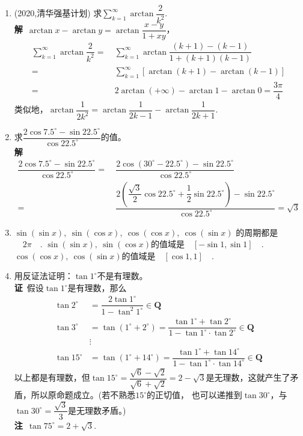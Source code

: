 \begin{enumerate}[label={【\textbf{例\thechapter.\arabic*}】},
 leftmargin=\inteval{\myenumleftmargin}pt,
 itemsep=\inteval{\myenumitempsep}pt,
 itemindent=\inteval{\myenumitemindent}pt]
\item (2020,清华强基计划) 求$ \sum\limits_{k=1}^{\infty}\arctan\dfrac{2}{k^2} $. 
\\ \textbf{解}\ $ \arctan x-\arctan y=\arctan\dfrac{x-y}{1+xy} $，
\begin{align*}
    \sum_{k=1}^{\infty}\arctan\dfrac{2}{k^2} 
    =&\ \sum_{k=1}^{\infty}\arctan\dfrac{(k+1)-(k-1)}{1+(k+1)(k-1)} \\
    =&\ \sum_{k=1}^{\infty}\left[
    \arctan(k+1)-\arctan(k-1) \right]\\
    =&\ 2\arctan(+\infty)-\arctan1-\arctan0=
    \dfrac{3\pi}{4}
\end{align*}
类似地，$ \arctan\dfrac{1}{2k^2}=\arctan\dfrac{1}{2k-1}-
\arctan\dfrac{1}{2k+1} $. 

\item 求$ \dfrac{2\cos7.5^{\circ}-\sin22.5^{\circ}}{\cos 22.5^{\circ}} $的值。\\
\textbf{解}\ 
\begin{align*}
    \dfrac{2\cos7.5^{\circ}-\sin22.5^{\circ}}{\cos 22.5^{\circ}}=&\ 
    \dfrac{2\cos(30^{\circ}-22.5^{\circ})-\sin22.5^{\circ}}{\cos 22.5^{\circ}}\\ 
    =&\ \dfrac{2(\dfrac{\sqrt{3}}{2}\cos22.5^{\circ}+\dfrac{1}{2}\sin22.5^{\circ})
        -\sin22.5^{\circ}}{\cos 22.5^{\circ}} = \sqrt{3}
\end{align*} 

\item $ \sin(\sin x),\ \sin(\cos x),\ \cos(\cos x),\ \cos(\sin x) $
的周期都是\underline{$\quad 2\pi \quad $}. $ \sin(\sin x),\ 
\sin(\cos x) $的值域是\underline{$\quad [-\sin 1,\sin 1] \quad$}. 
$ \cos(\cos x),\ \cos(\sin x) $的值域是\underline{$\quad
    [\cos 1,1] \quad $}. 

\item 用反证法证明：$ \tan 1^{\circ} $不是有理数。\\
\textbf{证}\ 假设$ \tan 1^{\circ} $是有理数，那么
\begin{align*}
    \tan 2^{\circ}&=\dfrac{2\tan 1^{\circ}}{1-\tan^2 1^{\circ}} \in \textbf{Q}\\
    \tan 3^{\circ}&=\tan (1^{\circ}+2^{\circ})=\dfrac{\tan 1^{\circ}
        +\tan 2^{\circ}}{1-\tan 1^{\circ}\cdot \tan 2^{\circ}} \in \textbf{Q} \\
    &\vdots \\
    \tan 15^{\circ}&=\tan (1^{\circ}+14^{\circ})=\dfrac{\tan 1^{\circ}+
        \tan 14^{\circ}}{1-\tan 1^{\circ}\cdot \tan 14^{\circ}} \in \textbf{Q}
\end{align*}
以上都是有理数，但$ \tan 15^{\circ}=\dfrac{\sqrt{6}-\sqrt{2}}{\sqrt{6}+\sqrt{2}}
=2-\sqrt{3} $是无理数，这就产生了矛盾，所以原命题成立。(若不熟悉$ 15^{\circ} $的正切值，
也可以递推到$ \tan 30^{\circ} $，与$ \tan 30^{\circ}=\dfrac{\sqrt{3}}{3} $是无理数矛盾。)\\
\textbf{注}\ $ \tan 75^{\circ}=2+\sqrt{3} $. 


\end{enumerate}
